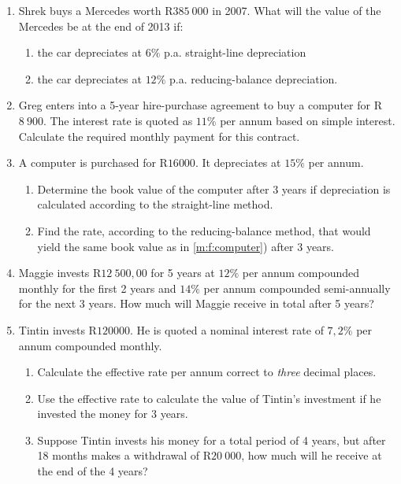 \begin{eocexercises}{}
\begin{enumerate}
\item{Shrek buys a Mercedes worth R$385~000$ in 2007. What will the value of the Mercedes be at the end of 2013 if:
\begin{enumerate}
\item{the car depreciates at $6\%$ p.a. straight-line depreciation}
\item{the car depreciates at $12\%$ p.a. reducing-balance depreciation.}
\end{enumerate}}

\item{Greg enters into a 5-year hire-purchase agreement to buy a computer for R$8~900$. The interest rate is quoted as $11\%$ per annum based on simple interest. Calculate the required monthly payment for this contract.}

\item{A computer is purchased for R$16 000$. It depreciates at $15\%$ per annum.
\begin{enumerate}
\item{Determine the book value of the computer after 3 years if depreciation
is calculated according to the straight-line method.}
\label{m:f:computer}
\item{Find the rate, according to the reducing-balance method, that would
yield the same book value as in \ref{m:f:computer}) after 3 years.}
\end{enumerate}}

\item{Maggie invests R$12~500,00$ for 5 years at $12\%$ per annum compounded monthly for
the first 2 years and $14\%$ per annum compounded semi-annually for the next 3
years. How much will Maggie receive in total after 5 years?}

\item{Tintin invests R$120 000$. He is quoted a nominal interest rate of $7,2\%$ per annum compounded monthly.
\begin{enumerate}
\item{Calculate the effective rate per annum correct to \textit{three} decimal
places.}
\item{Use the effective rate to calculate the value of Tintin's investment if
he invested the money for 3 years.}
\item{Suppose Tintin invests his money for a total period of 4 years, but
after 18 months makes a withdrawal of R$20~000$, how much will he
receive at the end of the 4 years?}
\end{enumerate}}


\end{enumerate}
\end{eocexercises}
